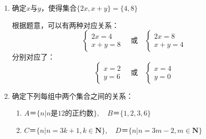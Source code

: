 \begin{enumerate}
    \item 确定$x$与$y$，使得集合$\{2x, x+y\} = \{4, 8\}$
    \begin{jieda}
        根据题意，可以有两种对应关系：
            \begin{equation*}
                \left\{  
                         \begin{array}{l}  
                            2x = 4\\  
                            x+y = 8
                         \end{array}
                \right.
                \quad \mbox{或} \quad
                \left\{  
                         \begin{array}{l}  
                            2x = 8\\  
                            x+y = 4
                         \end{array}
                \right.
            \end{equation*}
            分别对应了：
            \begin{equation*}
                \left\{  
                         \begin{array}{l}  
                            x = 2\\  
                            y = 6
                         \end{array}
                \right.
                \quad \mbox{或} \quad
                \left\{  
                         \begin{array}{l}  
                            x = 4\\  
                            y = 0
                         \end{array}
                \right.
            \end{equation*}
    \end{jieda}
    
    \item 确定下列每组中两个集合之间的关系：
    \begin{enumerate}
        \item $A ＝\{n | n \mbox{是}12\mbox{的正约数}\}, \quad B＝\{1,2,3,6\}$
        \item $C ＝\{n | n = 3k+1, k \in \mathbf{N}\}, \quad D＝\{n|n = 3m-2, m \in \mathbf{N}\}$
    \end{enumerate}
    \begin{jieda}
    

\end{jieda}
\end{enumerate}
